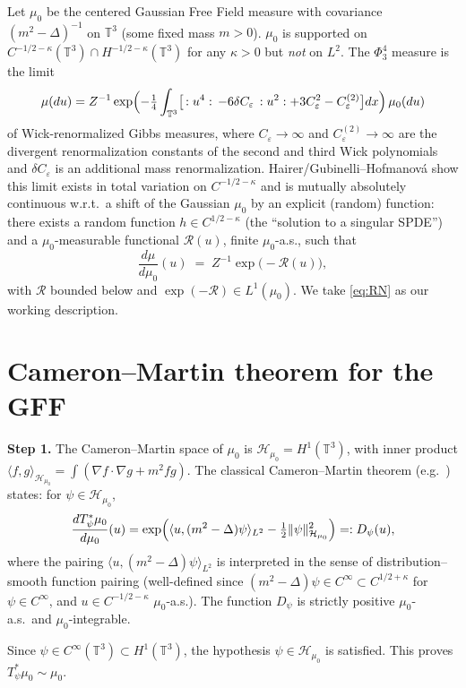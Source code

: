 Let $\mu_0$ be the centered Gaussian Free Field measure with covariance $(m^2-\Delta)^{-1}$ on $\mathbb T^3$ (some fixed mass $m>0$).  $\mu_0$ is supported on $C^{-1/2-\kappa}(\mathbb T^3)\cap H^{-1/2-\kappa}(\mathbb T^3)$ for any $\kappa>0$ but \emph{not} on $L^2$.  The $\Phi^4_3$ measure is the limit
\[
\mu(du) = Z^{-1}\exp\Bigl(-\tfrac14\int_{\mathbb T^3}\bigl[\,:u^4:\, - 6\delta C_\varepsilon\,:u^2: + 3 C_\varepsilon^2 - C^{(2)}_\varepsilon\bigr]dx\Bigr)\,\mu_0(du)
\]
of Wick-renormalized Gibbs measures, where $C_\varepsilon\to\infty$ and $C^{(2)}_\varepsilon\to\infty$ are the divergent renormalization constants of the second and third Wick polynomials and $\delta C_\varepsilon$ is an additional mass renormalization.  Hairer/Gubinelli--Hofmanová show this limit exists in total variation on $C^{-1/2-\kappa}$ and is mutually absolutely continuous w.r.t.\ a shift of the Gaussian $\mu_0$ by an explicit (random) function: there exists a random function $h\in C^{1/2-\kappa}$ (the ``solution to a singular SPDE'') and a $\mu_0$-measurable functional $\mathcal R(u)$, finite $\mu_0$-a.s., such that
\begin{equation}\label{eq:RN}
\frac{d\mu}{d\mu_0}(u)\;=\;Z^{-1}\exp\bigl(-\mathcal R(u)\bigr),
\end{equation}
with $\mathcal R$ bounded below and $\exp(-\mathcal R)\in L^1(\mu_0)$.  We take \eqref{eq:RN} as our working description.

\section*{Cameron--Martin theorem for the GFF}

\textbf{Step 1.}  The Cameron--Martin space of $\mu_0$ is $\mathcal H_{\mu_0}=H^1(\mathbb T^3)$, with inner product $\langle f,g\rangle_{\mathcal H_{\mu_0}}=\int(\nabla f\cdot\nabla g+m^2 fg)$.  The classical Cameron--Martin theorem (e.g.\ \cite[Thm 2.21]{DPZ}) states: for $\psi\in\mathcal H_{\mu_0}$,
\[
\frac{dT_\psi^*\mu_0}{d\mu_0}(u) = \exp\Bigl(\langle u,(m^2-\Delta)\psi\rangle_{L^2} - \tfrac12\|\psi\|_{\mathcal H_{\mu_0}}^2\Bigr) =: D_\psi(u),
\]
where the pairing $\langle u,(m^2-\Delta)\psi\rangle_{L^2}$ is interpreted in the sense of distribution--smooth function pairing (well-defined since $(m^2-\Delta)\psi\in C^\infty\subset C^{1/2+\kappa}$ for $\psi\in C^\infty$, and $u\in C^{-1/2-\kappa}$ $\mu_0$-a.s.).  The function $D_\psi$ is strictly positive $\mu_0$-a.s.\ and $\mu_0$-integrable.

Since $\psi\in C^\infty(\mathbb T^3)\subset H^1(\mathbb T^3)$, the hypothesis $\psi\in\mathcal H_{\mu_0}$ is satisfied.  This proves $T_\psi^*\mu_0\sim\mu_0$.

